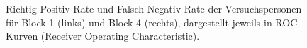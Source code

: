 \documentclass[doc,a4paper,12pt]{apa6}
\begin{document}
\begin{figure}[t]
  \centering
  \begin{minipage}{\textwidth}
    \hspace{0.02\textwidth}
    \vspace{10pt}
    \caption[Receiver Operating Characteristic Kurven]{Richtig-Positiv-Rate und Falsch-Negativ-Rate der Versuchspersonen für Block 1 (links) und Block 4 (rechts), dargestellt jeweils in ROC-Kurven (Receiver Operating Characteristic).}
    \label{roc}
  \end{minipage}
\end{figure}
\end{document}
